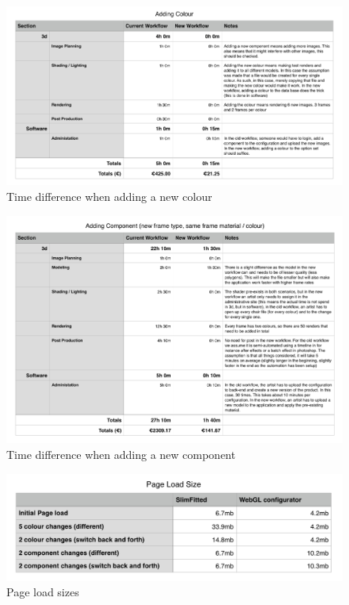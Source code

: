 \clearpage

\begin{figure}
\includegraphics[width=15cm]{images/addingNewColour}
\caption{Time difference when adding a new colour}
\label{attachment:addingNewColour}
\end{figure}

\begin{figure}
\includegraphics[width=15cm]{images/addingNewComponent}
\caption{Time difference when adding a new component}
\label{attachment:addingNewComponent}
\end{figure}

\clearpage

\begin{figure}
\includegraphics[width=15cm]{images/pageLoadSize}
\caption{Page load sizes}
\label{attachment:pageLoadSize}
\end{figure}

